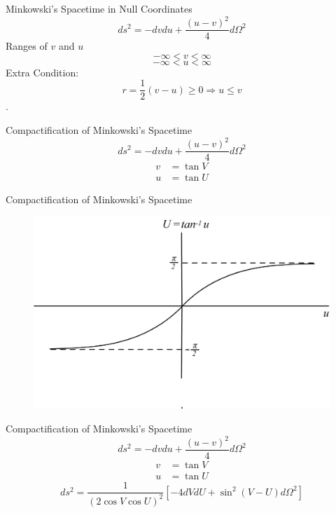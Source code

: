 \documentclass{beamer}
\begin{document}
        \begin{frame}{Minkowski's Spacetime in Null Coordinates}
			$$ ds^2= - dvdu + \frac{ \left( u-v \right)^2}{4} d\Omega^2 $$
			Ranges of $v$ and $u$
            	$$ -\infty <  v < \infty$$
                $$ -\infty <  u < \infty$$
            \pause
			Extra Condition: 
            $$r=\frac{1}{2}\left(v-u\right)\geq0 \Rightarrow u\leq v $$.
    	\end{frame}
        
        \begin{frame}{Compactification of Minkowski's Spacetime}
			$$ ds^2= - dvdu + \frac{ \left( u-v \right)^2}{4} d\Omega^2 $$
            \pause
            \begin{align*}
				v &=  \tan V\\
				u &=  \tan U
			\end{align*}
    	\end{frame}
        
        \begin{frame}{Compactification of Minkowski's Spacetime}
        	\begin{center}
				\begin{figure}
				\includegraphics[scale=0.75] {fig12.jpg}
				\end{figure}
			\end{center}	
        \end{frame}
        
    	\begin{frame}{Compactification of Minkowski's Spacetime}
			$$ ds^2= - dvdu + \frac{ \left( u-v \right)^2}{4} d\Omega^2 $$
            \begin{align*}
				v &=  \tan V\\
				u &=  \tan U
			\end{align*}
            \pause
            $$ds^2 = \frac{1}{\left(2\cos V\cos U\right)^{2}} \left[ -4dVdU + \sin^2 \left( V - U \right) d\Omega^2 \right]$$
    	\end{frame}
        
\end{document}
